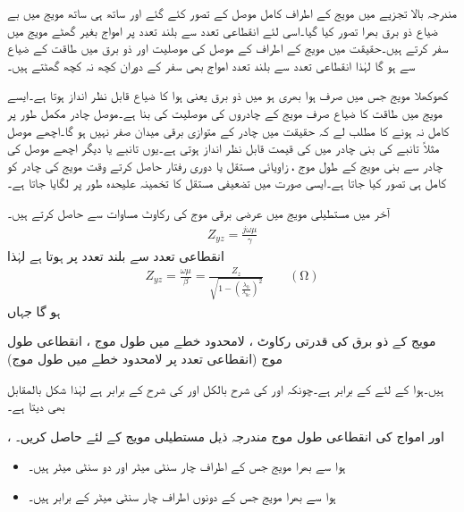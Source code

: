 مندرجہ بالا تجزیے میں مویج کے اطراف کامل موصل کے تصور کئے گئے اور ساتھ ہی ساتھ مویج میں بے ضیاع ذو برق بھرا تصور کیا گیا۔اسی لئے انقطاعی تعدد سے بلند تعدد پر امواج بغیر گھٹے مویج میں سفر کرتے ہیں۔حقیقت میں مویج کے اطراف کے موصل کی موصلیت اور ذو برق میں طاقت کے ضیاع سے   ہو گا لہٰذا انقطاعی تعدد سے بلند تعدد  امواج بھی سفر کے دوران کچھ نہ کچھ گھٹتے ہیں۔

کھوکھلا مویج جس میں صرف ہوا بھری ہو میں ذو برق یعنی ہوا کا ضیاع  قابل نظر انداز ہوتا ہے۔ایسے مویج میں طاقت کا ضیاع صرف مویج کے چادروں کی موصلیت کی بنا ہے۔موصل چادر مکمل طور پر کامل نہ ہونے کا مطلب لے کہ حقیقت میں چادر کے متوازی برقی میدان  صفر نہیں ہو گا۔اچھے موصل مثلاً تانبے کی بنی چادر میں  کی قیمت قابل نظر انداز ہوتی ہے۔یوں تانبے یا دیگر اچھے موصل کی چادر سے بنی مویج کے طول موج ، زاویائی مستقل  یا دوری رفتار  حاصل کرتے وقت مویج کی چادر کو کامل ہی تصور کیا جاتا ہے۔ایسی صورت میں تضعیفی مستقل  کا تخمینہ  علیحدہ طور پر لگایا جاتا ہے۔

آخر میں مستطیلی مویج میں عرضی برقی موج کی رکاوٹ  مساوات  سے حاصل کرتے ہیں۔
\begin{align}
Z_{yz}=\frac{j\omega \mu}{\gamma}
\end{align} 
انقطاعی تعدد سے بلند تعدد پر  ہوتا ہے لہٰذا
\begin{align}\label{مساوات_مویج_عرضی_برقی_رکاوٹ_حتمی}
Z_{yz}=\frac{\omega \mu}{\beta}=\frac{Z_z}{\sqrt{1-\left(\frac{\lambda_0}{\lambda_{0c}}\right)^2}} \quad \quad (\si{\ohm})
\end{align} 
ہو گا جہاں
\begin{description}
 مویج کے ذو برق کی قدرتی رکاوٹ ،
 لامحدود خطے میں طول موج ،
 انقطاعی طول موج (انقطاعی تعدد پر لامحدود خطے میں طول موج)
\end{description}
ہیں۔ہوا کے لئے  کے برابر ہے۔چونکہ  اور  کی شرح  بالکل  اور  کی شرح کے برابر ہے لہٰذا شکل    بالمقابل  بھی دیتا ہے۔

،  اور   امواج کی انقطاعی طول موج مندرجہ ذیل مستطیلی مویج کے لئے حاصل کریں۔
\begin{itemize}
\item
ہوا سے بھرا مویج جس کے اطراف  چار سنٹی میٹر اور دو سنٹی میٹر ہیں۔
\item
ہوا سے بھرا مویج جس کے دونوں اطراف  چار سنٹی میٹر کے برابر ہیں۔
\end{itemize} 

